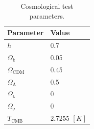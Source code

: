 \documentclass{aa}
\begin{document}
\begin{table}[h!] %
     \caption{Cosmological test parameters.} %
     \label{tab:test_parameters}
     \begin{tabular}{l|l}%
       \textbf{Parameter} & \textbf{Value}\\%
       \hline %
       $h$ & 0.7\\
       $\Omega_\mathrm{b}$ & 0.05\\
       $\Omega_\mathrm{CDM}$& 0.45\\
       $\Omega_\mathrm{\Lambda}$ & 0.5\\
       $\Omega_\mathrm{k}  $     & 0\\
       $\Omega_\mathrm{\nu}$ & 0\\
       $T_\mathrm{CMB}$ & 2.7255 $[K]$\\
       \hline
     \end{tabular}
 \end{table}
\end{document}
